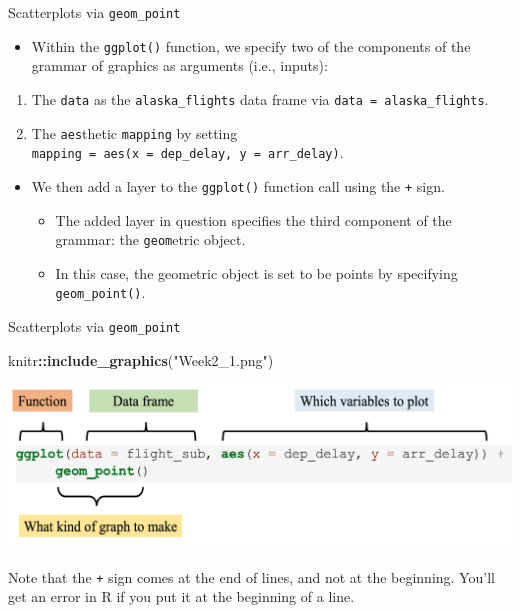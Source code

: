 \documentclass[
  ignorenonframetext,
]{beamer}
\newenvironment{Shaded}{\begin{snugshade}}{\end{snugshade}}
\newcommand{\FunctionTok}[1]{\textcolor[rgb]{0.13,0.29,0.53}{\textbf{#1}}}
\newcommand{\NormalTok}[1]{#1}
\newcommand{\SpecialCharTok}[1]{\textcolor[rgb]{0.81,0.36,0.00}{\textbf{#1}}}
\newcommand{\StringTok}[1]{\textcolor[rgb]{0.31,0.60,0.02}{#1}}
\providecommand{\tightlist}{%
  \setlength{\itemsep}{0pt}\setlength{\parskip}{0pt}}
\begin{document}
\begin{frame}[fragile]{Scatterplots via \texttt{geom\_point}}
\protect\hypertarget{scatterplots-via-geom_point-1}{}
\begin{itemize}
\tightlist
\item
  Within the \texttt{ggplot()} function, we specify two of the
  components of the grammar of graphics as arguments (i.e., inputs):
\end{itemize}

\begin{enumerate}
\item
  The \texttt{data} as the \texttt{alaska\_flights} data frame via
  \texttt{data\ =\ alaska\_flights}.
\item
  The \texttt{aes}thetic \texttt{mapping} by setting
  \texttt{mapping\ =\ aes(x\ =\ dep\_delay,\ y\ =\ arr\_delay)}.
\end{enumerate}

\begin{itemize}
\item
  We then add a layer to the \texttt{ggplot()} function call using the
  \texttt{+} sign.

  \begin{itemize}
  \tightlist
  \item
    The added layer in question specifies the third component of the
    grammar: the \texttt{geom}etric object.
  \item
    In this case, the geometric object is set to be points by specifying
    \texttt{geom\_point()}.
  \end{itemize}
\end{itemize}
\end{frame}

\begin{frame}[fragile]{Scatterplots via \texttt{geom\_point}}
\protect\hypertarget{scatterplots-via-geom_point-2}{}
\tiny

\begin{Shaded}
\begin{Highlighting}[]
\NormalTok{knitr}\SpecialCharTok{::}\FunctionTok{include\_graphics}\NormalTok{(}\StringTok{"Week2\_1.png"}\NormalTok{)}
\end{Highlighting}
\end{Shaded}

\begin{center}\includegraphics[width=0.8\linewidth,height=0.4\textheight]{Week2_1} \end{center}
\normalsize

Note that the \texttt{+} sign comes at the end of lines, and not at the
beginning. You'll get an error in R if you put it at the beginning of a
line.
\end{frame}
\end{document}
